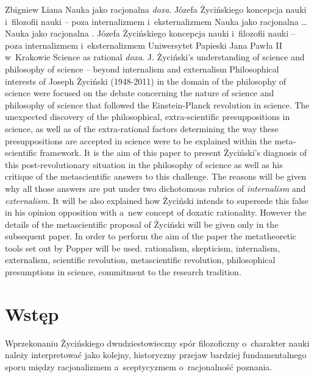 \begin{artplenv}{Zbigniew Liana}
	{Nauka jako racjonalna \textit{doxa}. Józefa Życińskiego koncepcja nauki i~filozofii nauki -- poza internalizmem i~eksternalizmem}
	{Nauka jako racjonalna {}\ldots}
	{Nauka jako racjonalna {}. Józefa Życińskiego koncepcja nauki i~filozofii nauki -- poza internalizmem i~eksternalizmem}
	{Uniwersytet Papieski Jana Pawła II w~Krakowie}
	{Science as rational \textit{doxa}. J. Życiński's understanding of science and philosophy of science -- beyond internalism and externalism}
	{Philosophical interests of Joseph Życiński (1948-2011) in the domain of the philosophy of science were focused on the
		debate concerning the nature of science and philosophy of science that followed the Einstein-Planck revolution in
		science. The unexpected discovery of the philosophical, extra-scientific  presuppositions in science, as well as of the
		extra-rational factors determining the way these presuppositions are accepted in science were to be explained within
		the meta-scientific framework. It is the aim of this paper to present Życiński's diagnosis of this post-revolutionary
		situation in the philosophy of science as well as his critique of the metascientific answers to this challenge. The
		reasons will be given why all those answers are put under two dichotomous rubrics of \textit{internalism} and
		\textit{externalism}. It will be also explained how Życiński intends to supersede this false in his opinion opposition
		with a~new concept of doxatic rationality. However the details of the metascientific proposal of Życiński will be given
		only in the subsequent paper. In order to perform the aim of the paper the metatheoretic tools set out by Popper
		\parencite*{popper_beiden_1979}
		will be used.}
	{rationalism, skepticism, internalism, externalism, scientific revolution, metascientific revolution, philosophical
		presumptions in science, commitment to the research tradition.}


\section*{Wstęp}

\lettrine[loversize=0.13,lines=2,lraise=-0.05,nindent=0em,findent=0.2pt]%
{W}{}przekonaniu Życińskiego dwudziestowieczny spór filozoficzny o~charakter nauki należy interpretować jako kolejny,
historyczny przejaw bardziej fundamentalnego sporu między racjonalizmem a~sceptycyzmem o~racjonalność poznania.


\end{artplenv}
